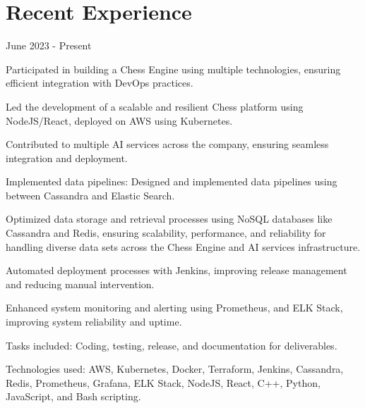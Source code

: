 \section{Recent Experience}

 {June 2023 - Present}
\begin{resume_list}
    \item Participated in building a Chess Engine using multiple technologies, ensuring efficient integration with DevOps practices.
    \item Led the development of a scalable and resilient Chess platform using NodeJS/React, deployed on AWS using Kubernetes.
    \item Contributed to multiple AI services across the company, ensuring seamless integration and deployment.
    \item Implemented data pipelines: Designed and implemented data pipelines using between Cassandra and Elastic Search.
    \item Optimized data storage and retrieval processes using NoSQL databases like Cassandra and Redis, ensuring scalability, performance, and reliability for handling diverse data sets across the Chess Engine and AI services infrastructure.
    \item Automated deployment processes with Jenkins, improving release management and reducing manual intervention.
    \item Enhanced system monitoring and alerting using Prometheus, and ELK Stack, improving system reliability and uptime.
    \item Tasks included: Coding, testing, release, and documentation for deliverables.
    \item Technologies used: AWS, Kubernetes, Docker, Terraform, Jenkins,  Cassandra, Redis, Prometheus, Grafana, ELK Stack, NodeJS, React, C++, Python, JavaScript, and Bash scripting.
\end{resume_list}

